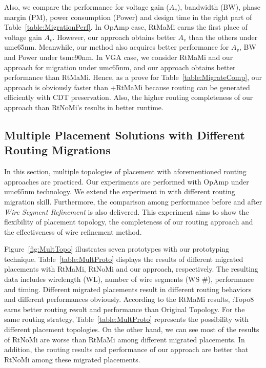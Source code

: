       Also, we compare the performance for voltage gain ($A_v$), bandwidth (BW), phase margin (PM), power consumption (Power) and design time in the right part of Table~\ref{table:MigrationPerf}. In OpAmp case, RtMaMi earns the first place of voltage gain $A_v$. However, our approach obtains better $A_v$ than the others under umc65nm. Meanwhile, our method also acquires better performance for $A_v$, BW and Power under tsmc90nm. In VGA case, we consider RtMaMi and our approach for migration under umc65nm, and our approach obtains better performance than RtMaMi. Hence, as a prove for Table~\ref{table:MigrateComp}, our approach is obviously faster than \cite{msc-bhattacharya-tcad06}+RtMaMi because routing can be generated efficiently with CDT preservation. Also, the higher routing completeness of our approach than RtNoMi's results in better runtime.


    \subsection{Multiple Placement Solutions with Different Routing Migrations}\label{sec:ExpMultiProto}

      In this section, multiple topologies of placement with aforementioned routing approaches are practiced. Our experiments are performed with OpAmp under umc65nm technology. 
      We extend the experiment in \cite{Chin_DMR_ICCAD2013} with different routing migration skill. Furthermore, the comparison among performance before and after {\it Wire Segment Refinement} is also delivered. This experiment aims to show the flexibility of placement topology, the completeness of our routing approach and the effectiveness of wire refinement method.

      Figure~\ref{fig:MultTopo} illustrates seven prototypes with our prototyping technique. Table~\ref{table:MultProto} displays the results of different migrated placements with RtMaMi, RtNoMi and our approach, respectively. The resulting data includes wirelength (WL), number of wire segments (WS \#), performance and timing. Different migrated placements result in different routing behaviors and different performances obviously. According to the RtMaMi results, \cite{ALP_YPWeng_iccad2011}:Topo8 earns better routing result and performance than Original Topology. For the same routing strategy, Table~\ref{table:MultProto} represents the possibility with different placement topologies. On the other hand, we can see most of the results of RtNoMi are worse than RtMaMi among different migrated placements. In addition, the routing results and performance of our approach are better that RtNoMi among these migrated placements. 

